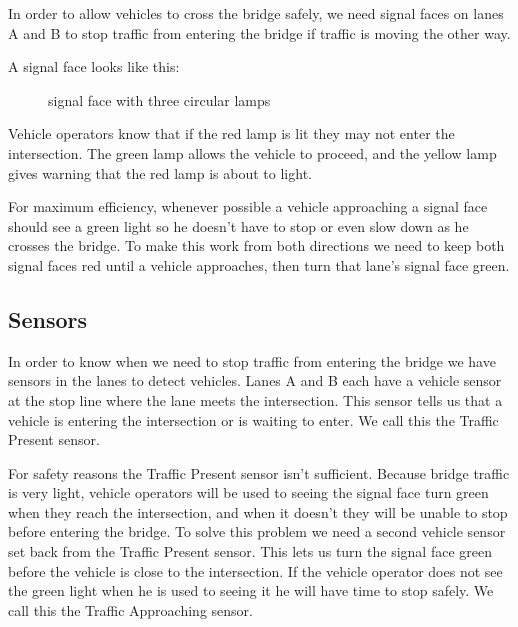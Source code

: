 \documentclass[letterpaper,twoside]{article}
\begin{document}
In order to allow vehicles to cross the bridge safely, we need signal
faces on lanes A and B to stop traffic from entering the bridge if
traffic is moving the other way.

A signal face looks like this:

\begin{figure}[H]
           {\caption{signal face with three circular lamps}
             \label{fig:signal_ccc}}
\end{figure}

Vehicle operators know that if the red lamp is lit they may not
enter the intersection.  The green lamp allows the vehicle to
proceed, and the yellow lamp gives warning that the red lamp
is about to light.

For maximum efficiency, whenever possible a vehicle approaching
a signal face should see a green light so he doesn't have to
stop or even slow down as he crosses the bridge.  To make this
work from both directions we need to keep both signal faces red
until a vehicle approaches, then turn that lane's signal face
green.

\subsection{Sensors}

In order to know when we need to stop traffic from entering the bridge
we have sensors in the lanes to detect vehicles.  Lanes A and B each
have a vehicle sensor at the stop line where the lane meets the
intersection.  This sensor tells us that a vehicle is entering
the intersection or is waiting to enter.  We call this the Traffic
Present sensor.

For safety reasons the Traffic Present sensor isn't sufficient.
Because bridge traffic is very light, vehicle operators will be
used to seeing the signal face turn green when they reach
the intersection, and when it doesn't they will be unable to stop
before entering the bridge.  To solve this problem we need a
second vehicle sensor set back from the Traffic Present sensor.
This lets us turn the signal face green before the vehicle is
close to the intersection.  If the vehicle operator does not
see the green light when he is used to seeing it he will have
time to stop safely.  We call this the Traffic Approaching sensor.
\end{document}
